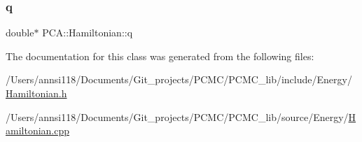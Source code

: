 \hypertarget{class_p_c_a_1_1_hamiltonian_a2ff873d072df1447deb904d615fe9f02}{}\label{class_p_c_a_1_1_hamiltonian_a2ff873d072df1447deb904d615fe9f02} 
\subsubsection{\texorpdfstring{q}{q}}
{\footnotesize\ttfamily double$\ast$ P\+C\+A\+::\+Hamiltonian\+::q\hspace{0.3cm}{\ttfamily [private]}}



The documentation for this class was generated from the following files\+:\begin{DoxyCompactItemize}
\item 
/\+Users/annsi118/\+Documents/\+Git\+\_\+projects/\+P\+C\+M\+C/\+P\+C\+M\+C\+\_\+lib/include/\+Energy/\hyperlink{_hamiltonian_8h}{Hamiltonian.\+h}\item 
/\+Users/annsi118/\+Documents/\+Git\+\_\+projects/\+P\+C\+M\+C/\+P\+C\+M\+C\+\_\+lib/source/\+Energy/\hyperlink{_hamiltonian_8cpp}{Hamiltonian.\+cpp}\end{DoxyCompactItemize}
